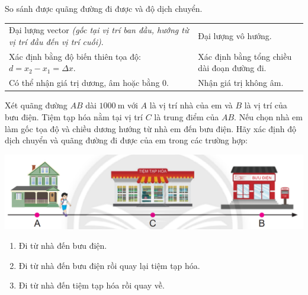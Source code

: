 \begin{dang}{So sánh được quãng đường đi được và độ dịch chuyển.}
	\begin{center}
		\begin{tabular}{|M{8cm}|M{8cm}|}
			\hline
			 & \\
			\hline
			Đại lượng vector \textit{(gốc tại vị trí ban đầu, hướng từ vị trí đầu đến vị trí cuối)}. & Đại lượng vô hướng.\\
			\hline
			Xác định bằng độ biến thiên tọa độ: $d=x_2-x_1=\Delta x$. & Xác định bằng tổng chiều dài đoạn đường đi.\\
			\hline
			Có thể nhận giá trị dương, âm hoặc bằng 0. & Nhận giá trị không âm.\\
			\hline
			
		\end{tabular}
	\end{center}
\end{dang}
\begin{vd}
	Xét quãng đường $AB$ dài $\SI{1000}{\meter}$ với $A$ là vị trí nhà của em và $B$ là vị trí của bưu điện. Tiệm tạp hóa nằm tại vị trí $C$ là trung điểm của $AB$. Nếu chọn nhà em làm gốc tọa độ và chiều dương hướng từ nhà em đến bưu điện. Hãy xác định độ dịch chuyển và quãng đường đi được của em trong các trường hợp:
	\begin{center}
		\includegraphics[width=0.6\linewidth]{figs/G10Y25B3-4}
	\end{center}
	\begin{enumerate}[label=\alph*)]
		\item Đi từ nhà đến bưu điện.
		\item Đi từ nhà đến bưu điện rồi quay lại tiệm tạp hóa.
		\item Đi từ nhà đến tiệm tạp hóa rồi quay về. 
	\end{enumerate}	
\end{vd}

